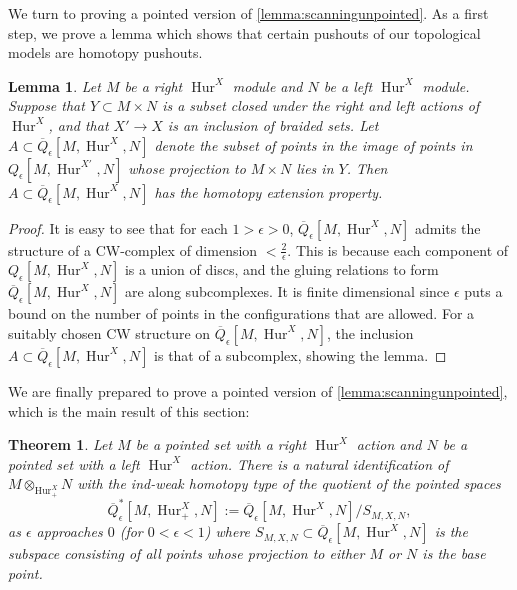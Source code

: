 \documentclass[12 pt]{amsart}
\theoremstyle{plain}
\newtheorem{theorem}[subsubsection]{Theorem}
\newtheorem{lemma}[theorem]{Lemma}
\theoremstyle{definition}
\theoremstyle{remark}
\numberwithin{equation}{section}
\DeclareMathOperator\Hur{Hur}
\begin{document}
We turn to proving a pointed version of \autoref{lemma:scanningunpointed}. As a first step, we prove a lemma which shows that certain pushouts of our topological models are homotopy pushouts.

\begin{lemma}\label{lemma:cofibration}
	Let $M$ be a right $\Hur^{X}$ module and $N$ be a left $\Hur^{X}$
	module. 
	Suppose that $Y \subset M\times N$ is a subset closed under the right
	and left actions of $\Hur^{X}$, and that $X' \to X$ is an inclusion of braided sets.
	Let
	$A\subset \overline{Q}_\epsilon[M,\Hur^{X},N]$ denote the subset of points in the image of points in $Q_{\epsilon}[M,\Hur^{X'},N]$ whose
	projection to $M\times N$ lies in $Y$.
	Then $A\subset \overline{Q}_\epsilon[M,\Hur^{X},N]$
	has the homotopy extension property.
\end{lemma}

\begin{proof}
	 It is easy to see that for each $1>\epsilon>0$, $\overline{Q}_{\epsilon}[M,\Hur^X,N]$ admits the structure of a CW-complex of dimension $<\frac 2 \epsilon$.
	 This is because each component of $Q_{\epsilon}[M,\Hur^X,N]$ is a union of discs, and the gluing relations to form $\overline{Q}_{\epsilon}[M,\Hur^X,N]$ are along subcomplexes. It is finite dimensional since $\epsilon$ puts a bound on the number of points in the configurations that are allowed.
	 For a suitably chosen
CW structure on $\overline{Q}_{\epsilon}[M,\Hur^X,N]$, 
the inclusion $A\subset \overline{Q}_\epsilon[M,\Hur^{X},N]$
is that of a subcomplex, showing the lemma.
\end{proof}


We are finally prepared to prove a pointed version of \autoref{lemma:scanningunpointed}, which is the main result of this section:
\begin{theorem}\label{lemma:modelquotdescriptionpointed}
	Let $M$ be a pointed set with a right $\Hur^X$ action and $N$ be a
	pointed set with a left $\Hur^{X}$ action. There is a natural
	identification of $M\otimes_{\Hur^{X}_+}N$ with the ind-weak homotopy
	type of the quotient of the pointed spaces
	$$\overline{Q}^*_\epsilon[M,\Hur_+^{X},N]:=
	\overline{Q}_\epsilon[M,\Hur^{X},N]/S_{M,X,N},$$ as $\epsilon$ approaches $0$ (for $0<\epsilon<1$) where $S_{M,X,N} \subset \overline{Q}_\epsilon[M,\Hur^{X},N]$ is the subspace
	consisting of all points whose projection to either $M$ or $N$ is the
	base point.
\end{theorem}
\end{document}
